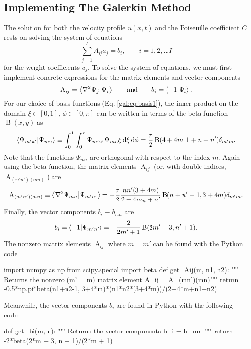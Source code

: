\documentclass[11pt, a4paper]{article}
\newcommand{\diff}{\mathop{}\!\mathrm{d}} %
\newcommand{\eqtext}[1]{\qquad \text{#1} \qquad}
\newcommand{\A}{\operatorname{A}}  %
\newcommand{\B}{\operatorname{B}}  %
\renewcommand{\laplacian}{\nabla^{2}}
\newcommand{\Pois}{Poiseuille\xspace}  %
\begin{document}
\subsection{Implementing The Galerkin Method}
The solution for both the velocity profile $ u(x, t) $ and the \Pois coefficient $ C $ rests on solving the system of equations
\begin{equation*}
	\sum_{j=1}^{I}A_{ij}a_{j} = b_{i}, \qquad i = 1, 2, \ldots I
\end{equation*}
for the weight coefficients $ a_{j} $. To solve the system of equations, we must first implement concrete expressions for the matrix elements and vector components
\begin{equation*}
	\A_{ij} = \ip{\laplacian \Psi_{j}}{\Psi_{i}} \eqtext{and} b_{i} = \ip{-1}{\Psi_{i}}.
\end{equation*}
For our choice of basis functions (Eq. \ref{gal:eq:basis1}), the inner product on the domain $ \xi \in [0, 1] $, $ \phi \in [0, \pi] $ can be written in terms of the beta function $ \B(x, y) $ as
\begin{equation*}
	\ip{\Psi_{m'n'}}{\Psi_{mn}} \equiv \int_{0}^{1}\int_{0}^{\pi} \Psi_{m'n'}\Psi_{mn}\xi \diff \xi \diff \phi = \frac{\pi}{2} \B(4 + 4m, 1 + n + n')\delta_{m'm}.
\end{equation*}
Note that the functions $ \Psi_{mn} $ are orthogonal with respect to the index $ m $. Again using the beta function, the matrix elements $ \A_{ij} $ (or, with double indices, $ \A_{(m'n')(mn)} $) are
\begin{equation}
	\A_{(m'n')(mn)} \equiv \ip{\laplacian \Psi_{mn}}{\Psi_{m'n'}} = -\frac{\pi}{2}\frac{nn'(3+4m)}{2+4m_n+n'}\B(n+n'-1,3+4m)\delta_{m'm}. \label{gal:eq:Aij}
\end{equation}
Finally, the vector components $ b_{i} \equiv b_{mn} $ are
\begin{equation*}
	b_{i} = \ip{-1}{\Psi_{m'n'}} = -\frac{2}{2m'+1}\B(2m'+3,n'+1).
\end{equation*}
The nonzero matrix elements $ \A_{ij} $ where $ m = m' $ can be found with the Python code
\begin{python}
import numpy as np
from scipy.special import beta
def get_Aij(m, n1, n2):
    """ Returns the nonzero (m' = m) matrix element A_{ij} = A_{(mn')(mn)}"""
    return -0.5*np.pi*beta(n1+n2-1, 3+4*m)*(n1*n2*(3+4*m))/(2+4*m+n1+n2)
\end{python}
Meanwhile, the vector components $ b_{i} $ are found in Python with the following code:
\begin{python}
def get_bi(m, n):
    """ Returns the vector components b_{i} = b_{mn} """
    return -2*beta(2*m + 3, n + 1)/(2*m + 1)
\end{python}
\end{document}

